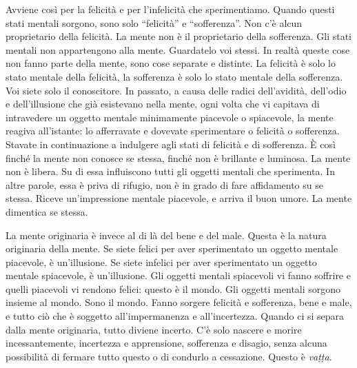 Avviene così per la felicità e per l'infelicità che sperimentiamo.
Quando questi stati mentali sorgono, sono solo ``felicità'' e
``sofferenza''. Non c'è alcun proprietario della felicità. La mente non
è il proprietario della sofferenza. Gli stati mentali non appartengono
alla mente. Guardatelo voi stessi. In realtà queste cose non fanno parte
della mente, sono cose separate e distinte. La felicità è solo lo stato
mentale della felicità, la sofferenza è solo lo stato mentale della
sofferenza. Voi siete solo il conoscitore. In passato, a causa delle
radici dell'avidità, dell'odio e dell'illusione che già esistevano nella
mente, ogni volta che vi capitava di intravedere un oggetto mentale
minimamente piacevole o spiacevole, la mente reagiva all'istante: lo
afferravate e dovevate sperimentare o felicità o sofferenza. Stavate in
continuazione a indulgere agli stati di felicità e di sofferenza. È così
finché la mente non conosce se stessa, finché non è brillante e
luminosa. La mente non è libera. Su di essa influiscono tutti gli
oggetti mentali che sperimenta. In altre parole, essa è priva di
rifugio, non è in grado di fare affidamento su se stessa. Riceve
un'impressione mentale piacevole, e arriva il buon umore. La mente
dimentica se stessa.

La mente originaria è invece al di là del bene e del male. Questa è la
natura originaria della mente. Se siete felici per aver sperimentato un
oggetto mentale piacevole, è un'illusione. Se siete infelici per aver
sperimentato un oggetto mentale spiacevole, è un'illusione. Gli oggetti
mentali spiacevoli vi fanno soffrire e quelli piacevoli vi rendono
felici: questo è il mondo. Gli oggetti mentali sorgono insieme al mondo.
Sono il mondo. Fanno sorgere felicità e sofferenza, bene e male, e tutto
ciò che è soggetto all'impermanenza e all'incertezza. Quando ci si
separa dalla mente originaria, tutto diviene incerto. C'è solo nascere e
morire incessantemente, incertezza e apprensione, sofferenza e disagio,
senza alcuna possibilità di fermare tutto questo o di condurlo a
cessazione. Questo è \emph{vaṭṭa}.

